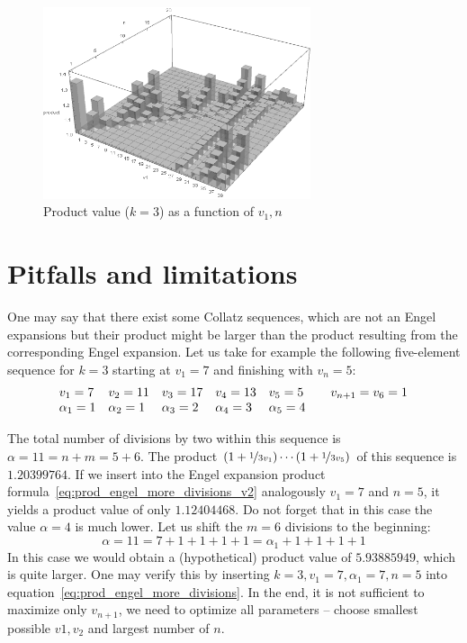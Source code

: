 \documentclass[12pt]{amsart}
\theoremstyle{definition}
\begin{document}
\begin{figure}
	\begin{center}
		\includegraphics[width=0.7\textwidth]{prod.png}
		\caption{Product value ($k=3$) as a function of $v_1,n$}
		\label{fig:2}
	\end{center}
\end{figure}

\section{Pitfalls and limitations}
One may say that there exist some Collatz sequences, which are not an Engel expansions but their product might be larger than the product resulting from the corresponding Engel expansion. Let us take for example the following five-element sequence for $k=3$ starting at $v_1=7$ and finishing with $v_{n}=5$:
\[
\begin{array}{l@{\hspace{1em}}l@{\hspace{1em}}l@{\hspace{1em}}l@{\hspace{1em}}l@{\hspace{2em}}l}
v_1=7&v_2=11&v_3=17&v_4=13&v_5=5&v_{n+1}=v_6=1\\
\alpha_1=1&\alpha_2=1&\alpha_3=2&\alpha_4=3&\alpha_5=4&
\end{array}
\]

The total number of divisions by two within this sequence is $\alpha=11=n+m=5+6$. The product $(1+\nicefrac{1}{3v_1})\cdots(1+\nicefrac{1}{3v_5})$ of this sequence is $1.20399764$. If we insert into the Engel expansion product formula~\ref{eq:prod_engel_more_divisions_v2} analogously $v_1=7$ and $n=5$, it yields a product value of only $1.12404468$. Do not forget that in this case the value $\alpha=4$ is much lower. Let us shift the $m=6$ divisions to the beginning:
\[
\alpha=11=7+1+1+1+1=\alpha_1+1+1+1+1
\]
In this case we would obtain a (hypothetical) product value of $5.93885949$, which is quite larger. One may verify this by inserting $k=3,v_1=7,\alpha_1=7,n=5$ into equation~\ref{eq:prod_engel_more_divisions}. In the end, it is not sufficient to maximize only $v_{n+1}$, we need to optimize all parameters -- choose smallest possible $v1,v_2$ and largest number of $n$.
\end{document}

